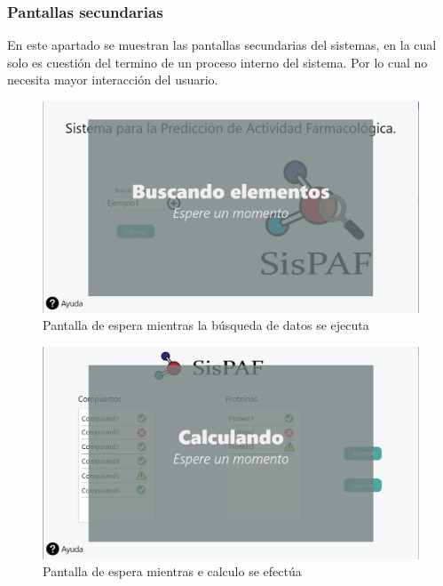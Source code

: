 \subsubsection{Pantallas secundarias}
\noindent En este apartado se muestran las pantallas secundarias del sistemas, en la cual solo es cuestión del termino de un proceso interno del sistema. Por lo cual no necesita mayor interacción del usuario.
\begin{figure}[H]
    \centering
    \includegraphics[scale=0.4]{Capitulo2/images/UI/4_Espera_busqueda.PNG}
    \caption{Pantalla de espera mientras la búsqueda de datos se ejecuta}
    \label{Espera_busq}
\end{figure}
\begin{figure}[H]
    \centering
    \includegraphics[scale=0.4]{Capitulo2/images/UI/6_espera_calculo.PNG}
    \caption{Pantalla de espera mientras e calculo se efectúa}
    \label{Espera_cal}
\end{figure}
